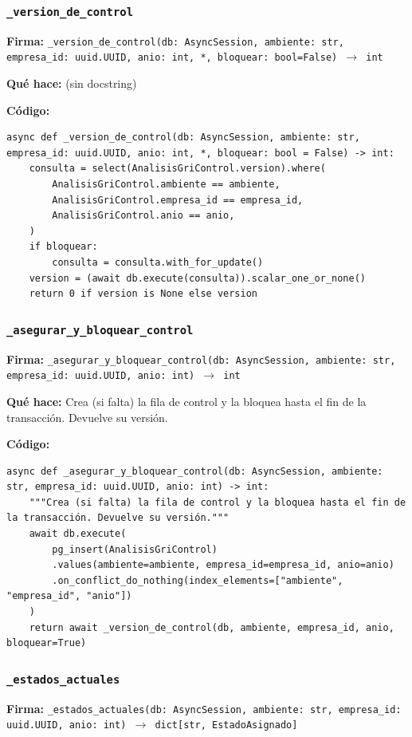 \documentclass[11pt,a4paper]{article}
\begin{document}
\subsubsection*{\texttt{\_version\_de\_control}}
\textbf{Firma:} \texttt{\_version\_de\_control(db: AsyncSession, ambiente: str, empresa\_id: uuid.UUID, anio: int, *, bloquear: bool=False) $\rightarrow$ int}

\textbf{Qué hace:} (sin docstring)

\textbf{Código:}
\begin{lstlisting}
async def _version_de_control(db: AsyncSession, ambiente: str, empresa_id: uuid.UUID, anio: int, *, bloquear: bool = False) -> int:
    consulta = select(AnalisisGriControl.version).where(
        AnalisisGriControl.ambiente == ambiente,
        AnalisisGriControl.empresa_id == empresa_id,
        AnalisisGriControl.anio == anio,
    )
    if bloquear:
        consulta = consulta.with_for_update()
    version = (await db.execute(consulta)).scalar_one_or_none()
    return 0 if version is None else version
\end{lstlisting}

\subsubsection*{\texttt{\_asegurar\_y\_bloquear\_control}}
\textbf{Firma:} \texttt{\_asegurar\_y\_bloquear\_control(db: AsyncSession, ambiente: str, empresa\_id: uuid.UUID, anio: int) $\rightarrow$ int}

\textbf{Qué hace:} Crea (si falta) la fila de control y la bloquea hasta el fin de la transacción. Devuelve su versión.

\textbf{Código:}
\begin{lstlisting}
async def _asegurar_y_bloquear_control(db: AsyncSession, ambiente: str, empresa_id: uuid.UUID, anio: int) -> int:
    """Crea (si falta) la fila de control y la bloquea hasta el fin de la transacción. Devuelve su versión."""
    await db.execute(
        pg_insert(AnalisisGriControl)
        .values(ambiente=ambiente, empresa_id=empresa_id, anio=anio)
        .on_conflict_do_nothing(index_elements=["ambiente", "empresa_id", "anio"])
    )
    return await _version_de_control(db, ambiente, empresa_id, anio, bloquear=True)
\end{lstlisting}

\subsubsection*{\texttt{\_estados\_actuales}}
\textbf{Firma:} \texttt{\_estados\_actuales(db: AsyncSession, ambiente: str, empresa\_id: uuid.UUID, anio: int) $\rightarrow$ dict[str, EstadoAsignado]}
\end{document}

